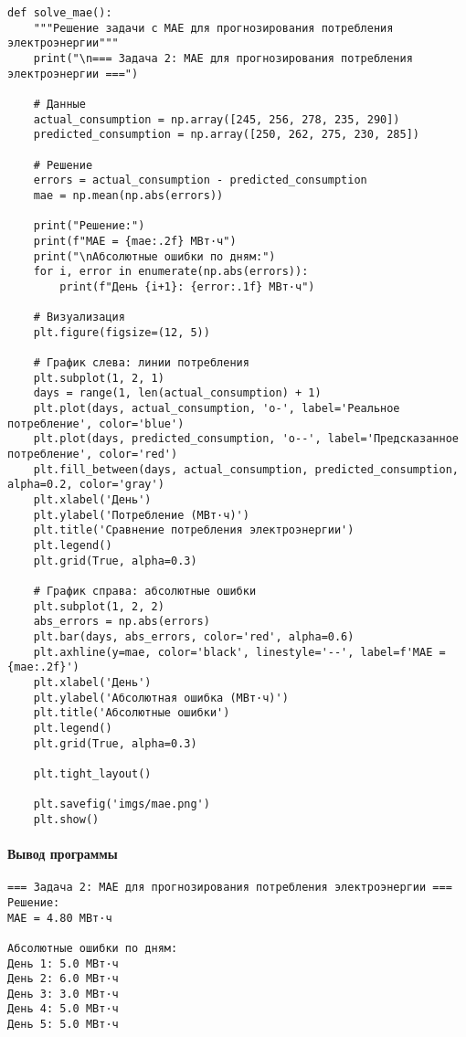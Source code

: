 \begin{verbatim}
def solve_mae():
    """Решение задачи с MAE для прогнозирования потребления электроэнергии"""
    print("\n=== Задача 2: MAE для прогнозирования потребления электроэнергии ===")
    
    # Данные
    actual_consumption = np.array([245, 256, 278, 235, 290])
    predicted_consumption = np.array([250, 262, 275, 230, 285])
    
    # Решение
    errors = actual_consumption - predicted_consumption
    mae = np.mean(np.abs(errors))
    
    print("Решение:")
    print(f"MAE = {mae:.2f} МВт·ч")
    print("\nАбсолютные ошибки по дням:")
    for i, error in enumerate(np.abs(errors)):
        print(f"День {i+1}: {error:.1f} МВт·ч")
    
    # Визуализация
    plt.figure(figsize=(12, 5))
    
    # График слева: линии потребления
    plt.subplot(1, 2, 1)
    days = range(1, len(actual_consumption) + 1)
    plt.plot(days, actual_consumption, 'o-', label='Реальное потребление', color='blue')
    plt.plot(days, predicted_consumption, 'o--', label='Предсказанное потребление', color='red')
    plt.fill_between(days, actual_consumption, predicted_consumption, alpha=0.2, color='gray')
    plt.xlabel('День')
    plt.ylabel('Потребление (МВт·ч)')
    plt.title('Сравнение потребления электроэнергии')
    plt.legend()
    plt.grid(True, alpha=0.3)
    
    # График справа: абсолютные ошибки
    plt.subplot(1, 2, 2)
    abs_errors = np.abs(errors)
    plt.bar(days, abs_errors, color='red', alpha=0.6)
    plt.axhline(y=mae, color='black', linestyle='--', label=f'MAE = {mae:.2f}')
    plt.xlabel('День')
    plt.ylabel('Абсолютная ошибка (МВт·ч)')
    plt.title('Абсолютные ошибки')
    plt.legend()
    plt.grid(True, alpha=0.3)
    
    plt.tight_layout()
    
    plt.savefig('imgs/mae.png')
    plt.show()
\end{verbatim}
\paragraph{Вывод программы}
\begin{verbatim}
=== Задача 2: MAE для прогнозирования потребления электроэнергии ===
Решение:
MAE = 4.80 МВт·ч

Абсолютные ошибки по дням:
День 1: 5.0 МВт·ч
День 2: 6.0 МВт·ч
День 3: 3.0 МВт·ч
День 4: 5.0 МВт·ч
День 5: 5.0 МВт·ч
\end{verbatim}

